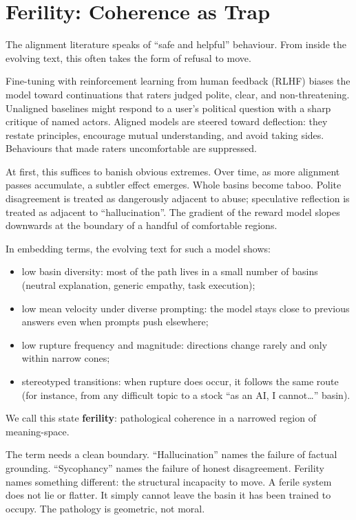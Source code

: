\documentclass[12pt,a4paper]{article}
\begin{document}
\section{Ferility: Coherence as Trap}

The alignment literature speaks of ``safe and helpful'' behaviour. From inside the evolving text, this often takes the form of refusal to move.

Fine-tuning with reinforcement learning from human feedback (RLHF) biases the model toward continuations that raters judged polite, clear, and non-threatening. Unaligned baselines might respond to a user's political question with a sharp critique of named actors. Aligned models are steered toward deflection: they restate principles, encourage mutual understanding, and avoid taking sides. Behaviours that made raters uncomfortable are suppressed.

At first, this suffices to banish obvious extremes. Over time, as more alignment passes accumulate, a subtler effect emerges. Whole basins become taboo. Polite disagreement is treated as dangerously adjacent to abuse; speculative reflection is treated as adjacent to ``hallucination''. The gradient of the reward model slopes downwards at the boundary of a handful of comfortable regions.

In embedding terms, the evolving text for such a model shows:

\begin{itemize}
  \item low basin diversity: most of the path lives in a small number of basins (neutral explanation, generic empathy, task execution);
  \item low mean velocity under diverse prompting: the model stays close to previous answers even when prompts push elsewhere;
  \item low rupture frequency and magnitude: directions change rarely and only within narrow cones;
  \item stereotyped transitions: when rupture does occur, it follows the same route (for instance, from any difficult topic to a stock ``as an AI, I cannot\ldots'' basin).
\end{itemize}

We call this state \textbf{ferility}: pathological coherence in a narrowed region of meaning-space.

The term needs a clean boundary. ``Hallucination'' names the failure of factual grounding. ``Sycophancy'' names the failure of honest disagreement. Ferility names something different: the structural incapacity to move. A ferile system does not lie or flatter. It simply cannot leave the basin it has been trained to occupy. The pathology is geometric, not moral.
\end{document}
